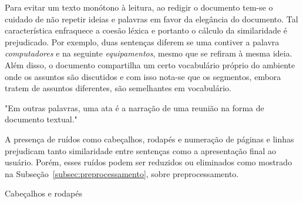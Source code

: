 Para evitar um texto monótono à leitura, ao redigir o documento tem-se o cuidado de não repetir ideias e palavras em favor da elegância do documento. Tal característica enfraquece a coesão léxica e portanto o cálculo da similaridade é prejudicado. Por exemplo, duas sentenças diferem se uma contiver a palavra \textit{computadores} e na seguinte \textit{equipamentos}, mesmo que se refiram à mesma ideia. Além disso, o documento compartilha um certo vocabulário próprio do ambiente onde os assuntos são discutidos e com isso nota-se que os segmentos, embora tratem de assuntos diferentes, são semelhantes em vocabulário.


"Em outras palavras, uma ata é a narração de uma reunião na forma de documento textual."

A presença de ruídos como cabeçalhos, rodapés e numeração de páginas e linhas prejudicam tanto similaridade entre sentenças como a apresentação final ao usuário. Porém, esses ruídos podem ser reduzidos ou eliminados como mostrado na Subseção~\ref{subsec:preprocessamento}, sobre preprocessamento.


  Cabeçalhos e rodapés




